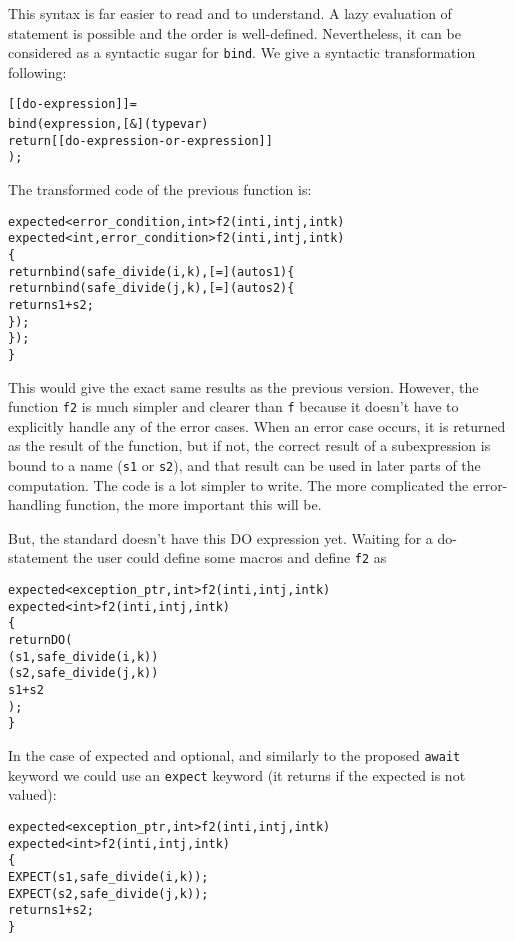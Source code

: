 \documentclass[a4paper,10pt]{article}
\newcommand{\cpp}[1]{\lstinline{#1}}
\newcommand{\suppress}[1]{\colorbox{suppress_color}{#1}}
\newcommand{\update}[1]{\colorbox{update_color}{#1}}
\begin{document}
This syntax is far easier to read and to understand. A lazy evaluation of statement is possible and the order is well-defined. Nevertheless, it can be considered as a syntactic sugar for \cpp{bind}. We give a syntactic transformation following:

\begin{alltt}
[[do-expression]] =
  bind(expression, [&](type var) {
    return [[do-expression-or-expression]]
  });
\end{alltt}
\noindent
The transformed code of the previous function is:

\begin{alltt}
\suppress{expected<error_condition, int> f2(int i, int j, int k)}
\update{expected<int, error_condition> f2(int i, int j, int k)}
\{
  return bind(safe_divide(i, k) ,[=](auto s1) \{
    return bind(safe_divide(j, k),[=](auto s2) \{
      return s1 + s2;
    \});
  \}); 
\}
\end{alltt}

This would give the exact same results as the previous version. However, the function \cpp{f2} is much simpler and clearer than \cpp{f} because it doesn't have to explicitly handle any of the error cases. When an error case occurs, it is returned as the result of the function, but if not, the correct result of a subexpression is bound to a name (\cpp{s1} or \cpp{s2}), and that result can be used in later parts of the computation. The code is a lot simpler to write. The more complicated the error-handling function, the more important this will be.

But, the standard doesn't have this DO expression yet.
Waiting for a do-statement the user could define some macros and define \cpp{f2} as

\begin{alltt}
\suppress{expected<exception_ptr,int> f2(int i, int j, int k)}
\update{expected<int> f2(int i, int j, int k)}
\{
    return DO (
         ( s1, safe_divide(i, k) )
         ( s2, safe_divide(j, k) )
         s1 + s2 
    );
\}
\end{alltt}

In the case of expected and optional, and similarly to the proposed \cpp{await} keyword we could use an \cpp{expect} keyword (it returns if the expected is not valued):

\begin{alltt}
\suppress{expected<exception_ptr,int> f2(int i, int j, int k)}
\update{expected<int> f2(int i, int j, int k)}
\{
  EXPECT(s1, safe_divide(i, k));
  EXPECT(s2, safe_divide(j, k));
  return s1 + s2;
\}
\end{alltt}
\end{document}
